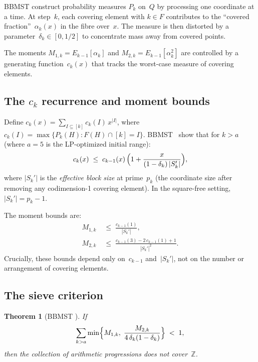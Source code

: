\documentclass[11pt]{amsart}
\newtheorem{theorem}{Theorem}[section]
\theoremstyle{definition}
\theoremstyle{remark}
\begin{document}
BBMST construct probability measures $P_k$ on~$Q$ by processing
one coordinate at a time.
At step~$k$, each covering element with $k \in F$ contributes to the
``covered fraction''~$\alpha_k(x)$ in the fibre over~$x$.
The measure is then distorted by a parameter~$\delta_k \in [0, 1/2]$
to concentrate mass away from covered points.

The moments $M_{1,k} = E_{k-1}[\alpha_k]$ and
$M_{2,k} = E_{k-1}[\alpha_k^2]$ are controlled by a generating
function~$c_k(x)$ that tracks the worst-case measure of
covering elements.

\subsection{The $c_k$ recurrence and moment bounds}

Define $c_k(x) = \sum_{I \subseteq [k]} c_k(I)\, x^{|I|}$,
where $c_k(I) = \max\{P_k(H) : F(H) \cap [k] = I\}$.
BBMST~\cite[Lemma~3.3, Theorem~3.2]{BBMST2019} show that for $k > a$
(where $a = 5$ is the LP-optimized initial range):
\begin{equation}\label{eq:ck-recurrence}
  c_k(x)
  \;\le\;
  c_{k-1}(x)\,\Bigl(1 + \frac{x}{(1 - \delta_k)\,|S_k'|}\Bigr),
\end{equation}
where $|S_k'|$ is the \emph{effective block size} at prime~$p_k$
(the coordinate size after removing any codimension-1 covering element).
In the square-free setting, $|S_k'| = p_k - 1$.

The moment bounds are:
\begin{align}
  M_{1,k} &\;\le\; \frac{c_{k-1}(1)}{|S_k'|}, \label{eq:M1}\\[4pt]
  M_{2,k} &\;\le\; \frac{c_{k-1}(3) - 2\,c_{k-1}(1) + 1}{|S_k'|^2}.
  \label{eq:M2}
\end{align}
Crucially, these bounds depend only on~$c_{k-1}$ and~$|S_k'|$, not on
the number or arrangement of covering elements.

\subsection{The sieve criterion}

\begin{theorem}[{BBMST \cite[Theorem~3.1]{BBMST2019}}]\label{thm:criterion}
If
\begin{equation}\label{eq:sieve-sum}
  \sum_{k > a}
  \min\Bigl\{M_{1,k},\;
  \frac{M_{2,k}}{4\,\delta_k(1-\delta_k)}\Bigr\}
  \;<\; 1,
\end{equation}
then the collection of arithmetic progressions does not cover~$\mathbb{Z}$.
\end{theorem}
\end{document}
